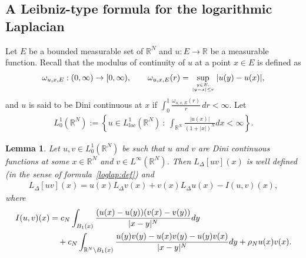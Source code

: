 \documentclass[11pt]{article}
\newcommand{\R}{\mathbb{R}}
\numberwithin{equation}{section}
\newtheorem{lemma}[theorem]{Lemma}
\begin{document}
\subsection{A Leibniz-type formula for the logarithmic Laplacian}\label{Leib:sec}

Let $E$ be a bounded measurable set of $\mathbb R^N$ and $u:E\to \mathbb{R}$ be a measurable function. Recall that the modulus of continuity of $u$ at a point $x\in E$ is defined as
%
\begin{align*}
    \omega_{u,x,E}:(0,\infty)\to[0,\infty), \qquad \omega_{u,x,E}(r)=\sup_{
    \genfrac{}{}{0pt}{2}{y\in E,}{|y-x|\leq r}
    }|u(y)-u(x)|,
\end{align*}
%
and $u$ is said to be Dini continuous at $x$ if $\int_{0}^{1}\frac{\omega_{u,x,E}(r)}{r}\,dr<\infty$. Let 
\begin{align*}
 L_0^1(\mathbb R^N):=\left\{
 u\in L^1_{loc}(\R^N)\::\:\int_{\mathbb R^N}\frac{|u(x)|}{(1+|x|)^{N}}dx < \infty
 \right\}.
\end{align*}
%

\begin{lemma}
    Let $u,v\in L_0^1(\mathbb R^N)$ be such that $u$ and $v$ are Dini continuous functions at some $x\in \mathbb R^N$ and $v\in L^\infty(\mathbb R^N)$. Then $L_{\Delta}[uv](x)$ is well defined (in the sense of formula~\eqref{loglap:def}) and 
    \begin{align}\label{eq:leib_log}
        L_{\Delta}[uv](x)= u(x)L_{\Delta}v(x)+v(x) L_{\Delta}u(x)-I(u,v)(x),
    \end{align}
    where
    \begin{align}\notag
        I(u,v)(x)&=c_{N}\int_{B_{1}(x)}\frac{(u(x)-u(y))(v(x)-v(y))}{|x-y|^N}dy\\ 
        &\quad +c_{N} \int_{\R^N\setminus B_1(x)}\frac{u(y)v(y)-u(x)v(y)-u(y)v(x)}{|x-y|^N}dy
        +\rho_{N}u(x)v(x). \label{eq:def_I}
    \end{align}
\end{lemma}
\end{document}

